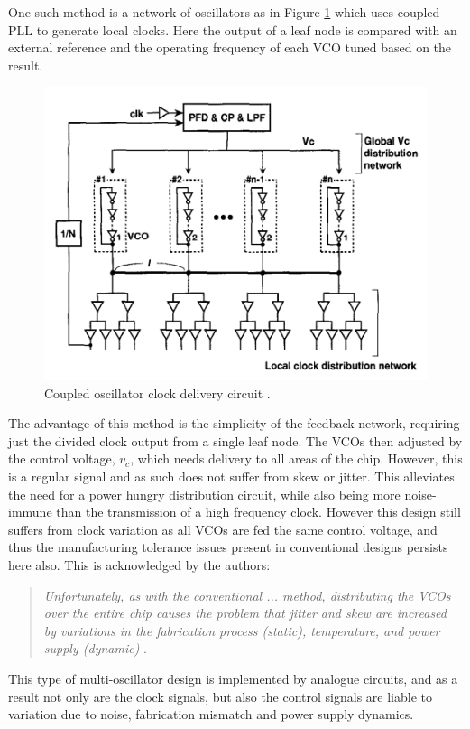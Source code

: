 One such method is a network of oscillators as in Figure \ref{fig:mizuno1998noise} which uses coupled \ac{PLL} to generate local clocks. Here the output of a leaf node is compared with an external reference and the operating frequency of each \ac{VCO} tuned based on the result.
\begin{figure}[h]
	\centering
	\includegraphics[scale=0.7]{../mizuno1998noise}
	\caption[Coupled oscillator clock delivery circuit]{Coupled oscillator clock delivery circuit \cite{mizuno1998noise}.}
	\label{fig:mizuno1998noise}
\end{figure}
The advantage of this method is the simplicity of the feedback network, requiring just the divided clock output from a single leaf node. The \acp{VCO} then adjusted by the control voltage, $v_c$, which needs delivery to all areas of the chip. However, this is a regular signal and as such does not suffer from skew or jitter. This alleviates the need for a power hungry distribution circuit, while also being more noise-immune than the transmission of a high frequency clock. However this design still suffers from clock variation as all \acp{VCO} are fed the same control voltage, and thus the manufacturing tolerance issues present in conventional designs persists here also. This is acknowledged by the authors:
\begin{quotation}
	\textit{Unfortunately, as with the conventional ... method, distributing the \acp{VCO} over the entire chip causes the problem that jitter and skew are increased by variations in the fabrication process (static), temperature, and power supply (dynamic)} \cite{mizuno1998noise}.
\end{quotation}
This type of multi-oscillator design is implemented by analogue circuits, and as a result not only are the clock signals, but also the control signals are liable to variation due to noise, fabrication mismatch and power supply dynamics.

